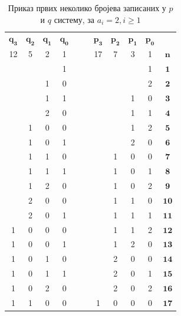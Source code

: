 \documentclass[a4paper]{article}
\begin{document}
\begin{table}[h!]
	\caption{Приказ првих неколико бројева записаних у $ p $ и $ q $ систему, за $ a_{i} = 2 , i \ge 1 $}
	\label{tab:p_q_sistem}
	\begin{center}
		\begin{tabular}{ | c | c | c | c | c  c | c | c | c | c | c |}
			\hline
			{$ \mathbf{q_{3}} $} &  {$ \mathbf{q_{2}} $} &  {$ \mathbf{q_{1}} $} &  {$ \mathbf{q_{0}} $} & & &  {$ \mathbf{p_{3}} $} &  {$ \mathbf{p_{2}} $} &  {$ \mathbf{p_{1}} $} &  {$ \mathbf{p_{0}} $} &\\
			12 & 5 & 2 & 1 & & & 17 & 7 & 3 & 1 &  {$ \mathbf{n} $}\\
			\hline
			&  &  & 1 & & &  &  &  & 1 & {$ \mathbf{1} $}\\
			&  & 1 & 0 & & &  &  &  & 2 & {$ \mathbf{2} $}\\
			&  & 1 & 1 & & &  &  & 1 & 0 &  {$ \mathbf{3} $}\\
			&  & 2 & 0 & & &  &  & 1 & 1 &  {$ \mathbf{4} $}\\
			& 1 & 0 & 0 & & &  &  & 1 & 2 &  {$ \mathbf{5} $}\\
			& 1 & 0 & 1 & & &  &  & 2 & 0 &  {$ \mathbf{6} $}\\
			& 1 & 1 & 0 & & &  & 1 & 0 & 0 &  {$ \mathbf{7} $}\\
			& 1 & 1 & 1 & & &  & 1 & 0 & 1 &  {$ \mathbf{8} $}\\
			& 1 & 2 & 0 & & &  & 1 & 0 & 2 &  {$ \mathbf{9} $}\\
			& 2 & 0 & 0 & & &  & 1 & 1 & 0 &  {$ \mathbf{10} $}\\
			& 2 & 0 & 1 & & &  & 1 & 1 & 1 &  {$ \mathbf{11} $}\\
			 1 & 0 & 0 & 0 & & & & 1 & 1 & 2 &  {$ \mathbf{12} $}\\
			 1 & 0 & 0 & 1 & & & & 1 & 2 & 0 &  {$ \mathbf{13} $}\\
			 1 & 0 & 1 & 0 & & & & 2 & 0 & 0 &  {$ \mathbf{14} $}\\
			 1 & 0 & 1 & 1 & & & & 2 & 0 & 1 &  {$ \mathbf{15} $}\\
			 1 & 0 & 2 & 0 & & & & 2 & 0 & 2 &  {$ \mathbf{16} $}\\
			 1 & 1 & 0 & 0 & & & 1 & 0 & 0 & 0 &  {$ \mathbf{17} $}\\
			\hline 
		\end{tabular}
	\end{center}
\end{table}
\end{document}
